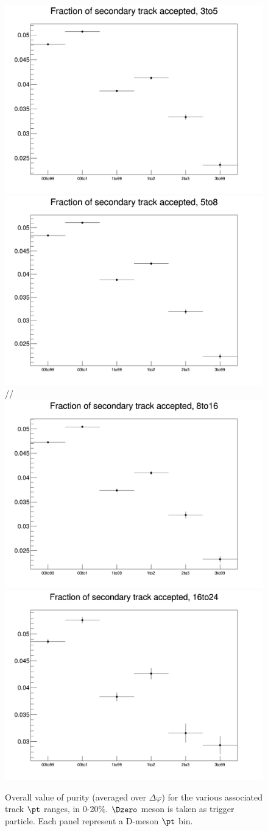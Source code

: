 \begin{figure}
\centering
{\includegraphics[width=0.45\linewidth]{figuresVsCent/Global/Purity/Output_Plots_0_20_DCA100/FractOfSecOverTotal_3to5.png}}
{\includegraphics[width=0.45\linewidth]{figuresVsCent/Global/Purity/Output_Plots_0_20_DCA100/FractOfSecOverTotal_5to8.png}} //
{\includegraphics[width=0.45\linewidth]{figuresVsCent/Global/Purity/Output_Plots_0_20_DCA100/FractOfSecOverTotal_8to16.png}}
{\includegraphics[width=0.45\linewidth]{figuresVsCent/Global/Purity/Output_Plots_0_20_DCA100/FractOfSecOverTotal_16to24.png}}
 \caption{Overall value of purity (averaged over $\Delta\varphi$) for the various associated track $\pt$ ranges, in 0-20\%. $\Dzero$ meson is taken as trigger particle. Each panel represent a D-meson $\pt$ bin.}
\label{fig:PurityFlat020}
\end{figure}

